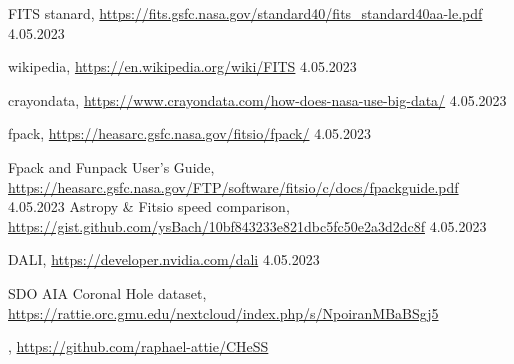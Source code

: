 \documentclass[licencjacka,en]{pracamgr}
\begin{document}
\begin{thebibliography}{99}
         {FITS stanard},
        \url{https://fits.gsfc.nasa.gov/standard40/fits_standard40aa-le.pdf} 4.05.2023

         {wikipedia},
        \url{https://en.wikipedia.org/wiki/FITS} 4.05.2023

         {crayondata},
        \url{https://www.crayondata.com/how-does-nasa-use-big-data/} 4.05.2023

         {fpack},
        \url{https://heasarc.gsfc.nasa.gov/fitsio/fpack/} 4.05.2023
        
         {Fpack and Funpack User's Guide},
        \url{https://heasarc.gsfc.nasa.gov/FTP/software/fitsio/c/docs/fpackguide.pdf} 4.05.2023 
         {Astropy \& Fitsio speed comparison},
        \url{https://gist.github.com/ysBach/10bf843233e821dbc5fc50e2a3d2dc8f} 4.05.2023 
        
         DALI,
        \url{https://developer.nvidia.com/dali} 4.05.2023

         {SDO AIA Coronal Hole dataset},
        \url{https://rattie.orc.gmu.edu/nextcloud/index.php/s/NpoiranMBaBSgj5}

        ,
        \url{https://github.com/raphael-attie/CHeSS}
        
        

        
        
\end{thebibliography}
\end{document}
